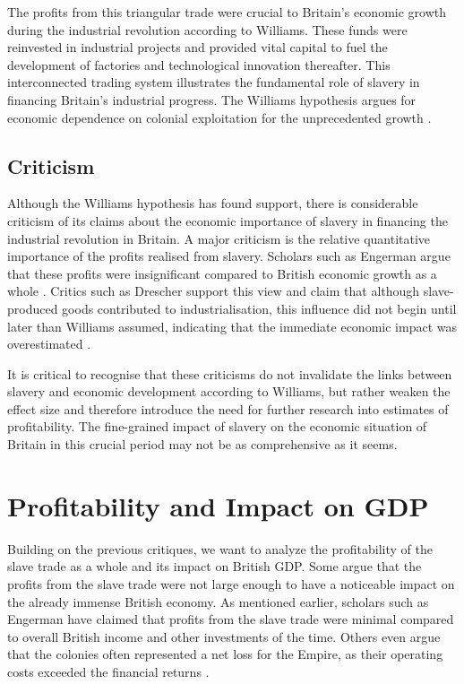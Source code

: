 \documentclass[a4paper,11pt]{article}
\begin{document}
The profits from this triangular trade were crucial to Britain's economic growth during the industrial revolution according to Williams. These funds were reinvested in industrial projects and provided vital capital to fuel the development of factories and technological innovation thereafter. This interconnected trading system illustrates the fundamental role of slavery in financing Britain's industrial progress. The Williams hypothesis argues for economic dependence on colonial exploitation for the unprecedented growth \citep{solow1985}.

\subsection{Criticism}

Although the Williams hypothesis has found support, there is considerable criticism of its claims about the economic importance of slavery in financing the industrial revolution in Britain. A major criticism is the relative quantitative importance of the profits realised from slavery. Scholars such as Engerman argue that these profits were insignificant compared to British economic growth as a whole \citep{eltisengerman2000}. Critics such as Drescher support this view and claim that although slave-produced goods contributed to industrialisation, this influence did not begin until later than Williams assumed, indicating that the immediate economic impact was overestimated \citep{drescher1997}.

It is critical to recognise that these criticisms do not invalidate the links between slavery and economic development according to Williams, but rather weaken the effect size and therefore introduce the need for further research into estimates of profitability. The fine-grained impact of slavery on the economic situation of Britain in this crucial period may not be as comprehensive as it seems.

\section{Profitability and Impact on GDP}

Building on the previous critiques, we want to analyze the profitability of the slave trade as a whole and its impact on British GDP. Some argue that the profits from the slave trade were not large enough to have a noticeable impact on the already immense British economy. As mentioned earlier, scholars such as Engerman have claimed that profits from the slave trade were minimal compared to overall British income and other investments of the time. Others even argue that the colonies often represented a net loss for the Empire, as their operating costs exceeded the financial returns \citep{eltisengerman2000}.
\end{document}
